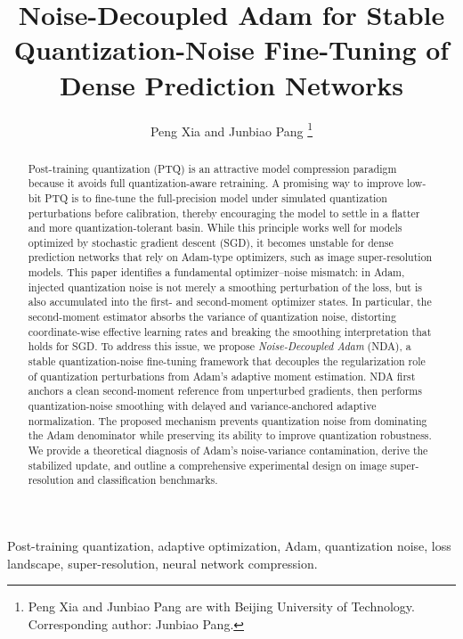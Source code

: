 \documentclass[journal]{IEEEtran}
\begin{document}
\title{Noise-Decoupled Adam for Stable Quantization-Noise Fine-Tuning of Dense Prediction Networks}

\author{Peng Xia and Junbiao Pang%
\thanks{Peng Xia and Junbiao Pang are with Beijing University of Technology. Corresponding author: Junbiao Pang.}
}

\maketitle

\begin{abstract}
Post-training quantization (PTQ) is an attractive model compression paradigm because it avoids full quantization-aware retraining. A promising way to improve low-bit PTQ is to fine-tune the full-precision model under simulated quantization perturbations before calibration, thereby encouraging the model to settle in a flatter and more quantization-tolerant basin. While this principle works well for models optimized by stochastic gradient descent (SGD), it becomes unstable for dense prediction networks that rely on Adam-type optimizers, such as image super-resolution models. This paper identifies a fundamental optimizer--noise mismatch: in Adam, injected quantization noise is not merely a smoothing perturbation of the loss, but is also accumulated into the first- and second-moment optimizer states. In particular, the second-moment estimator absorbs the variance of quantization noise, distorting coordinate-wise effective learning rates and breaking the smoothing interpretation that holds for SGD. To address this issue, we propose \emph{Noise-Decoupled Adam} (NDA), a stable quantization-noise fine-tuning framework that decouples the regularization role of quantization perturbations from Adam's adaptive moment estimation. NDA first anchors a clean second-moment reference from unperturbed gradients, then performs quantization-noise smoothing with delayed and variance-anchored adaptive normalization. The proposed mechanism prevents quantization noise from dominating the Adam denominator while preserving its ability to improve quantization robustness. We provide a theoretical diagnosis of Adam's noise-variance contamination, derive the stabilized update, and outline a comprehensive experimental design on image super-resolution and classification benchmarks.
\end{abstract}

\begin{IEEEkeywords}
Post-training quantization, adaptive optimization, Adam, quantization noise, loss landscape, super-resolution, neural network compression.
\end{IEEEkeywords}
\end{document}
